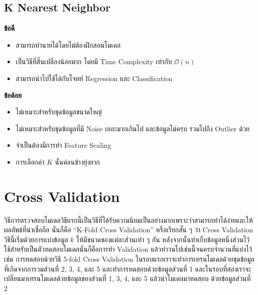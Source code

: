 \subsection{K Nearest Neighbor}
\label{ssec:pros_cons_knn}

\noindent \textbf{ข้อดี}
\begin{itemize}[topsep=0pt]
    \item สามารถทำนายได้โดยไม่ต้องฝึกสอนโมเดล
    
    \item เป็นวิธีที่สิ้นเปลืองน้อยมาก โดยมี Time Complexity เท่ากับ $\mathcal{O}(n)$
    
    \item สามารถนำไปใช้ได้กับโจทย์ Regression และ Classification
\end{itemize}

\noindent \textbf{ข้อด้อย}
\begin{itemize}[topsep=0pt]
    \item ไม่เหมาะสำหรับชุดข้อมูลขนาดใหญ่
    
    \item ไม่เหมาะสำหรับชุดข้อมูลที่มี Noise เยอะมากเกินไป และข้อมูลไม่ครบ รวมไปถึง Outlier ด้วย 
    
    \item จำเป็นต้องมีการทำ Feature Scaling
    
    \item การเลือกค่า $K$ นั้นค่อนข้างยุ่งยาก
\end{itemize}

\section{Cross Validation}
\label{sec:cross_val}

วิธีการตรวจสอบโมเดลวิธีแรกนี้เป็นวิธีที่ได้รับความนิยมเป็นอย่างมากเพราะว่าสามารถทำได้ง่ายและให้ผลลัพธ์ที่น่าเชื่อถือ นั่นก็คือ 
\enquote{K-Fold Cross Validation} หรือเรียกสั้น ๆ ว่า Cross Validation วิธีนี้เริ่มด้วยการแบ่งข้อมูล $k$ ให้มีขนาดของแต่ละส่วนเท่า ๆ กัน 
หลังจากนั้นทำเก็บข้อมูลหนึ่งส่วนไว้ใช้สำหรับเป็นตัวทดสอบโมเดลนั่นก็คือการทำ Validation แล้วทําวนไปเช่นนี้จนครบจํานวนที่แบ่งไว้ เช่น 
การทดสอบด้วยวิธี 5-fold Cross Validation ในรอบแรกเราจะทำการเทรนโมเดลด้วยชุดข้อมูลที่เกิดจากการวมส่วนที่ 2, 3, 4, และ 5 
และทำการทดสอบด้วยข้อมูลส่วนที่ 1 และในรอบที่สองเราจะเปลี่ยนมาเทรนโมเดลด้วยข้อมูลของส่วนที่ 1, 3, 4, และ 5 แล้วนำโมเดลมาทดสอบ%
ด้วยข้อมูลส่วนที่ 2

